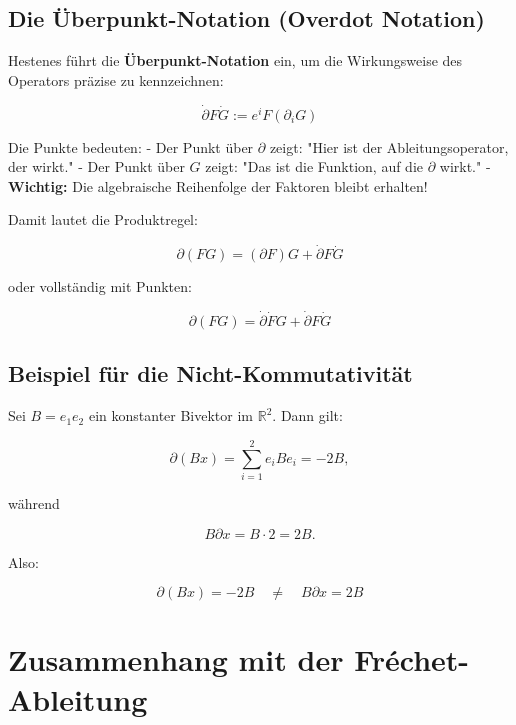 \documentclass[11pt]{article}
\begin{document}
\subsection{Die Überpunkt-Notation (Overdot Notation)}

Hestenes führt die \textbf{Überpunkt-Notation} ein, um die Wirkungsweise des Operators präzise zu kennzeichnen:

\[
\boxed{
\dot{\partial} F \dot{G} := e^i F (\partial_i G)
}
\]

Die Punkte bedeuten:
- Der Punkt über \(\partial\) zeigt: "Hier ist der Ableitungsoperator, der wirkt."
- Der Punkt über \(G\) zeigt: "Das ist die Funktion, auf die \(\partial\) wirkt."
- \textbf{Wichtig:} Die algebraische Reihenfolge der Faktoren bleibt erhalten!

Damit lautet die Produktregel:

\[
\boxed{
\partial (FG) = (\partial F)G + \dot{\partial} F \dot{G}
}
\]

oder vollständig mit Punkten:

\[
\boxed{
\partial (FG) = \dot{\partial} \dot{F} G + \dot{\partial} F \dot{G}
}
\]

\subsection{Beispiel für die Nicht-Kommutativität}

Sei \(B = e_1 e_2\) ein konstanter Bivektor im \(\mathbb R^2\). Dann gilt:

\[
\partial (B x) = \sum_{i=1}^2 e_i B e_i = -2B,
\]

während

\[
B \partial x = B \cdot 2 = 2B.
\]

Also:

\[
\boxed{
\partial (B x) = -2B \quad \neq \quad B \partial x = 2B
}
\]

\begin{center}
\end{center}

\section{Zusammenhang mit der Fréchet-Ableitung}
\end{document}
